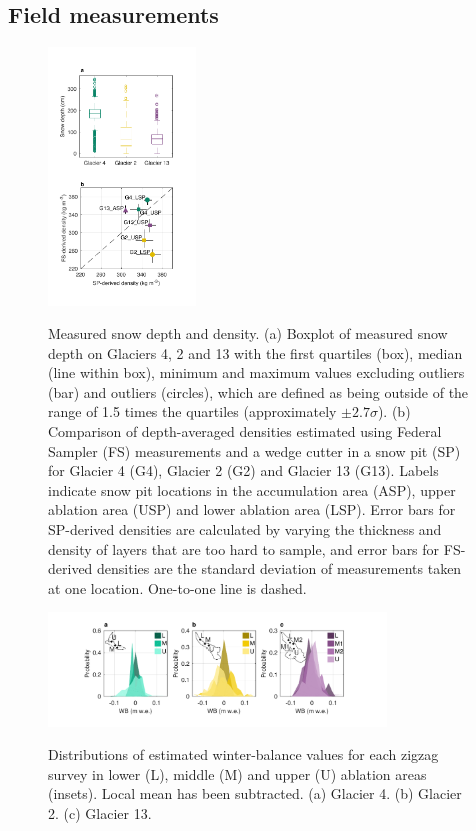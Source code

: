 \documentclass[review,oneside, letterpaper]{igs}
\begin{document}
\subsection{Field measurements}

\begin{figure}
	\centering
	\includegraphics[width =0.35\textwidth]{DepthBoxplot_SPvsFS.pdf}\\
	\caption{Measured snow depth and density. (a) Boxplot of measured snow depth on Glaciers 4, 2 and 13 with the first quartiles (box), median (line within box), minimum and maximum values excluding outliers (bar) and outliers (circles), which are defined as being outside of the range of 1.5 times the quartiles (approximately $\pm2.7\sigma$). (b) Comparison of depth-averaged densities estimated using Federal Sampler (FS) measurements and  a wedge cutter in a snow pit (SP)  for Glacier 4 (G4), Glacier 2 (G2) and Glacier 13 (G13). Labels indicate snow pit locations in the accumulation area (ASP), upper ablation area (USP) and lower ablation area (LSP). Error bars for SP-derived densities are calculated by varying the thickness and density of layers that are too hard to sample, and error bars for FS-derived densities are the standard deviation of measurements taken at one location. One-to-one line is dashed.}
	\label{fig:DepthBoxplot_SPvsFS}
\end{figure}

\begin{figure}
	\centering
	\includegraphics[width =0.8\textwidth]{ZigzagHistogram.pdf}\\
	\caption{Distributions of estimated winter-balance values for each zigzag survey in lower (L), middle (M) and upper (U) ablation areas (insets). Local mean has been subtracted. (a) Glacier 4. (b) Glacier 2. (c) Glacier 13.}
	\label{fig:ZigzagHistogram}
\end{figure}
\end{document}
